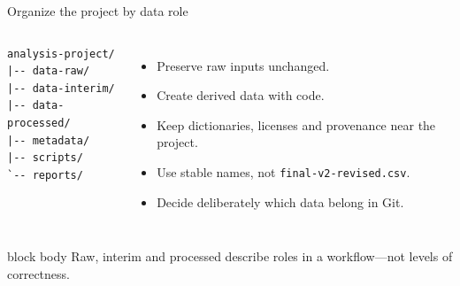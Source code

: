 \documentclass[10pt,aspectratio=169]{beamer}
\begin{document}
\begin{frame}[fragile]{Organize the project by data role}

\scriptsize

\begin{columns}[T]


\begin{verbatim}
analysis-project/
|-- data-raw/
|-- data-interim/
|-- data-processed/
|-- metadata/
|-- scripts/
`-- reports/
\end{verbatim}


\small

\begin{itemize}
  \item Preserve raw inputs unchanged.
  \item Create derived data with code.
  \item Keep dictionaries, licenses and provenance near the project.
  \item Use stable names, not \texttt{final-v2-revised.csv}.
  \item Decide deliberately which data belong in Git.
\end{itemize}

\end{columns}

\vspace{0.30cm}

\begin{beamercolorbox}[rounded=true,sep=8pt]{block body}
Raw, interim and processed describe roles in a workflow---not levels of correctness.
\end{beamercolorbox}

\end{frame}
\end{document}
